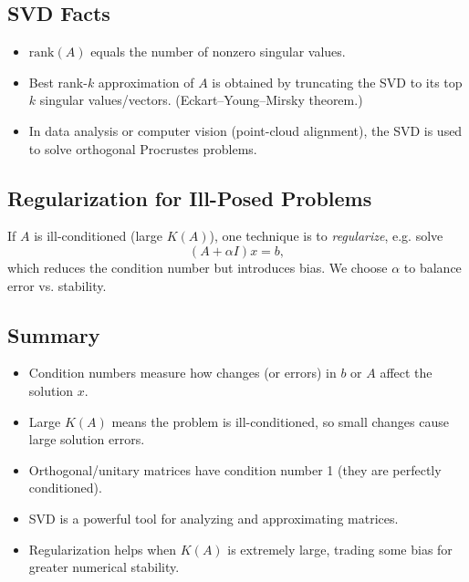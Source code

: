 \subsection*{SVD Facts}

\begin{itemize}
    \item $\mathrm{rank}(A)$ equals the number of nonzero singular values.
    \item Best rank-$k$ approximation of $A$ is obtained by truncating the SVD to its top $k$ singular values/vectors. (Eckart--Young--Mirsky theorem.)
    \item In data analysis or computer vision (point-cloud alignment), the SVD is used to solve orthogonal Procrustes problems.
\end{itemize}

\subsection*{Regularization for Ill-Posed Problems}

If $A$ is ill-conditioned (large $K(A)$), one technique is to \emph{regularize}, e.g. solve
\[
(A + \alpha I)x = b,
\]
which reduces the condition number but introduces bias. We choose $\alpha$ to balance error vs. stability.

\subsection*{Summary}

\begin{itemize}
    \item Condition numbers measure how changes (or errors) in $b$ or $A$ affect the solution $x$.
    \item Large $K(A)$ means the problem is ill-conditioned, so small changes cause large solution errors.
    \item Orthogonal/unitary matrices have condition number 1 (they are perfectly conditioned).
    \item SVD is a powerful tool for analyzing and approximating matrices.
    \item Regularization helps when $K(A)$ is extremely large, trading some bias for greater numerical stability.
\end{itemize}
